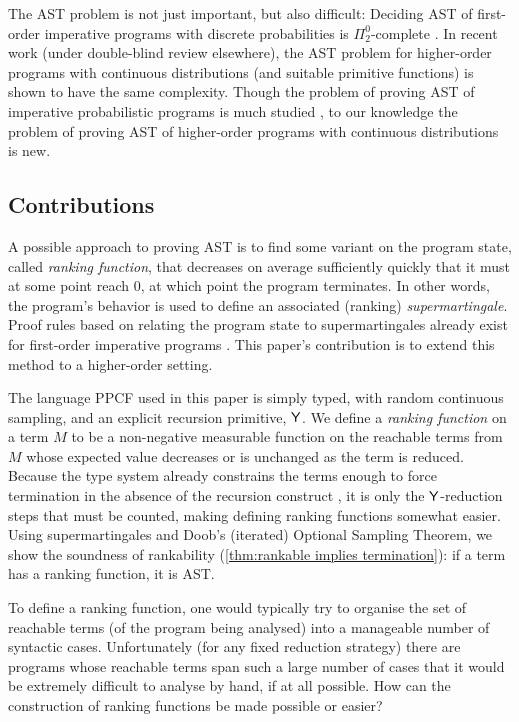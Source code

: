 The AST problem is not just important, but also difficult: 
Deciding AST of first-order imperative programs with discrete probabilities is $\Pi^0_2$-complete \cite{DBLP:conf/mfcs/KaminskiK15}.
In recent work (under double-blind review elsewhere), the AST problem for higher-order programs with continuous distributions (and suitable primitive functions) is shown to have the same complexity.
Though the problem of proving AST of imperative probabilistic programs is much studied \cite{DBLP:journals/jacm/KaminskiKMO18,DBLP:conf/lics/OlmedoKKM16,DBLP:conf/mfcs/KaminskiK15,DBLP:series/mcs/McIverM05,DBLP:conf/popl/FioritiH15,DBLP:conf/pldi/ChenH20,DBLP:journals/toplas/ChatterjeeFNH18}, to our knowledge the problem of proving AST of higher-order programs with continuous distributions is new.

\subsection*{Contributions}

A possible approach to proving AST is to find some variant on the program state, called \emph{ranking function}, that decreases on average sufficiently quickly that it must at some point reach 0, at which point the program terminates. 
In other words, the program's behavior is used to define an associated (ranking) \emph{supermartingale}. Proof rules based on relating the program state to supermartingales already exist for first-order imperative programs \cite{DBLP:conf/cav/ChakarovS13,DBLP:conf/popl/FioritiH15,DBLP:journals/pacmpl/McIverMKK18}. This paper's contribution is to extend this method to a higher-order setting.

The language PPCF used in this paper is simply typed, with random continuous sampling, and an explicit recursion primitive, $\mathsf{Y}$. 
We define a \emph{ranking function} on a term $M$ to be a non-negative measurable function on the reachable terms from $M$ whose expected value decreases or is unchanged as the term is reduced.
Because the type system already constrains the terms enough to force termination in the absence of the recursion construct \cite{tait1967,BarendregtDS2010}, it is only the $\mathsf{Y}$-reduction steps that must be counted, making defining ranking functions somewhat easier.
Using supermartingales and Doob's (iterated) Optional Sampling Theorem, we show the soundness of rankability (\cref{thm:rankable implies termination}): if a term has a ranking function, it is AST.

To define a ranking function, one would typically try to organise the set of reachable terms (of the program being analysed) into a manageable number of syntactic cases. 
Unfortunately (for any fixed reduction strategy) there are programs whose reachable terms span such a large number of cases that it would be extremely difficult to analyse by hand, if at all possible. 
How can the construction of ranking functions be made possible or easier?

